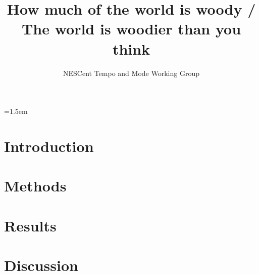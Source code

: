 \documentclass[12pt]{article}
\title{How much of the world is woody / The world is woodier than you
  think}
\author{NESCent Tempo and Mode Working Group}
\date{}
\affiliation{\noindent
Fill this in here\ldots}
\begin{document}
\mstitlepage
\parindent=1.5em
\addtolength{\parskip}{.3em}

\section{Introduction}
\section{Methods}

\section{Results}

\section{Discussion}
\end{document}
